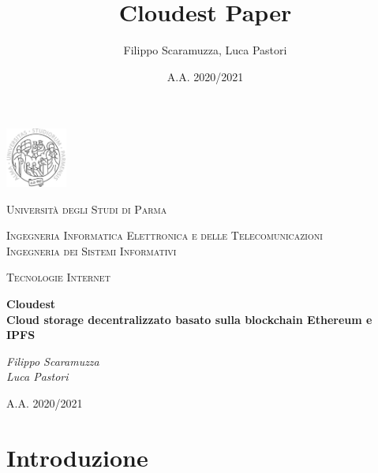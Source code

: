 \documentclass{article}
\title{Cloudest Paper}
\author{Filippo Scaramuzza, Luca Pastori}
\date{A.A. 2020/2021}
\begin{document}
 
\begin{titlepage}
	\centering
	\includegraphics[width=0.15\textwidth]{images/unipr_centrato_2righe_pos_rgb.jpg}\par\vspace{1cm}
	{\scshape\LARGE Università degli Studi di Parma \par}
	\vspace{1cm}
	{\scshape\Large Ingegneria Informatica Elettronica e delle Telecomunicazioni\\
	Ingegneria dei Sistemi Informativi\\\par}
	\vspace{0.5cm}
	{\scshape\Large Tecnologie Internet\par}
	\vspace{1.5cm}
	{\huge\bfseries Cloudest\\
	Cloud storage decentralizzato basato sulla blockchain Ethereum e IPFS \par}
	\vspace{2cm}
	{\Large\itshape Filippo Scaramuzza\\Luca Pastori\par}
	\vfill

	{\large A.A. 2020/2021 \par}
\end{titlepage}


\newpage

\tableofcontents
\newpage
{}
\setcounter{page}{1}

\section{Introduzione}
\end{document}
